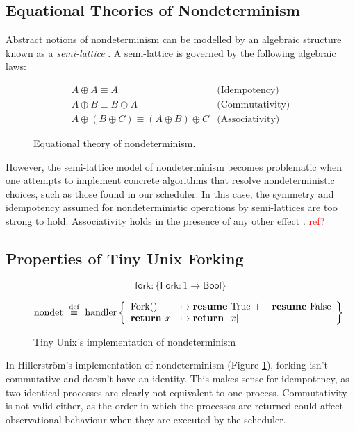 \documentclass[logo,bsc,singlespacing,parskip]{infthesis}
\begin{document}
\subsection{Equational Theories of Nondeterminism}
Abstract notions of nondeterminism can be modelled by an algebraic structure known as a \textit{semi-lattice} \cite{Pretnar:2010}. A semi-lattice is governed by the following algebraic laws:

\begin{figure}[H]
\centering
\[
\begin{array}{ll}
  A \oplus A \equiv A & \text{(Idempotency)} \\
  A \oplus B \equiv B \oplus A & \text{(Commutativity)} \\
  A \oplus (B \oplus C) \equiv (A \oplus B) \oplus C & \text{(Associativity)}
\end{array}
\]
\caption{%
  Equational theory of nondeterminism.
}
\end{figure}



However, the semi-lattice model of nondeterminism becomes problematic when one attempts to implement concrete algorithms that resolve nondeterministic choices, such as those found in our scheduler. In this case, the symmetry and idempotency assumed for nondeterministic operations by semi-lattices are too strong to hold. Associativity holds in the presence of any other effect \cite{NotByEquationsAlone}. \textcolor{red}{ref?}



\subsection{Properties of Tiny Unix Forking}


\begin{figure}[H]
\centering
\[
\mathsf{fork} : \{ \mathsf{Fork} : 1 \rightarrow \mathsf{Bool} \}
\]

\[
\text{nondet} \ \overset{\text{def}}{\equiv} \ \text{handler} \left\{
\begin{array}{ll}
\text{Fork}() &\mapsto \text{\textbf{resume} True ++ \textbf{resume} False} \\
\textbf{return } x &\mapsto \textbf{return } [x]
\end{array}
\right\}
\]
\caption{Tiny Unix's implementation of nondeterminism}
\label{nondetImplementation}
\end{figure}


In Hillerström's implementation of nondeterminism (Figure  \ref{nondetImplementation}), forking isn't commutative and doesn't have an identity. This makes sense for idempotency, as two identical processes are clearly not equivalent to one process. Commutativity is not valid either, as the order in which the processes are returned could affect observational behaviour when they are executed by the scheduler.
\end{document}
